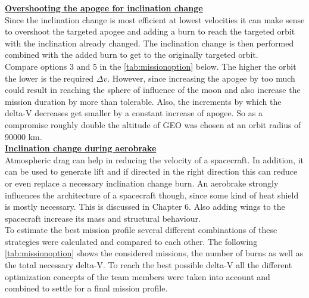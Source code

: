 \textbf{\underline{Overshooting the apogee for inclination change}}\\
Since the inclination change is most efficient at lowest velocities it can make sense to overshoot the
targeted apogee and adding a burn to reach the targeted orbit with the inclination already changed. The
inclination change is then performed combined with the added burn to get to the originally targeted orbit.\\

Compare options 3 and 5 in the \autoref{tab:missionoption} below. The higher the orbit the lower is the required $\Delta v$.
However, since increasing the apogee by too much could result in reaching the sphere of influence of the
moon and also increase the mission duration by more than tolerable. Also, the increments by which the
delta-V decreases get smaller by a constant increase of apogee. So as a compromise roughly double the
altitude of GEO was chosen at an orbit radius of 90000 km.\\

\textbf{\underline{Inclination change during aerobrake}}\\
Atmospheric drag can help in reducing the velocity of a spacecraft. In addition, it can be used to generate lift and if directed in the right direction this can reduce or even replace a necessary inclination change burn. An aerobrake strongly influences the architecture of a spacecraft though, since some kind of heat shield is mostly necessary. This is discussed in Chapter 6. Also adding wings to the spacecraft increase its mass and structural behaviour.\\

To estimate the best mission profile several different combinations of these strategies were calculated
and compared to each other. The following \autoref{tab:missionoption} shows the considered missions, the number of burns as well as the total necessary delta-V. To reach the best possible delta-V all the different optimization concepts of the team members were taken into account and combined to settle for a final mission profile.


